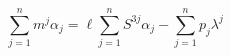 \begin{equation} 
\sum_{j=1}^n m^j \alpha_j = \ell \sum_{j=1}^n S^{3j} \alpha_j - 
                        \sum_{j=1}^n p_j \lambda^j
\end{equation}

